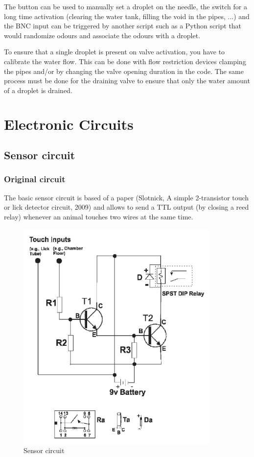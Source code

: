 \documentclass[a4paper]{article}
\begin{document}
The button can be used to manually set a droplet on the needle, the switch for a long time activation (clearing the water tank, filling the void in the pipes, ...) and the BNC input can be triggered by another script such as a Python script that would randomize odours and associate the odours with a droplet.

To ensure that a single droplet is present on valve activation, you have to calibrate the water flow. This can be done with flow restriction devices clamping the pipes and/or by changing the valve opening duration in the code. The same process must be done for the draining valve to ensure that only the water amount of a droplet is drained.


\section{Electronic Circuits}
\subsection{Sensor circuit}
\subsubsection{Original circuit}
The basic sensor circuit is based of a paper (Slotnick, A simple 2-transistor touch or lick detector circuit, 2009) and allows to send a TTL output (by closing a reed relay) whenever an animal touches two wires at the same time.

\begin{figure}[h!]
    \centering
    \includegraphics[width = 10cm]{images/sensor.png}
    \caption{Sensor circuit}
    \label{fig:sensor}
\end{figure}
\end{document}
